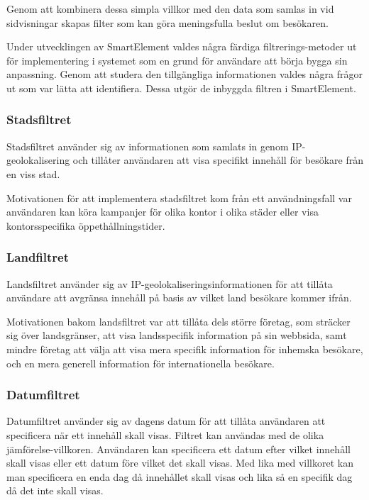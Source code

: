 Genom att kombinera dessa simpla villkor med den data som samlas in vid sidvisningar skapas filter som kan göra meningsfulla beslut om besökaren.

Under utvecklingen av SmartElement valdes några färdiga filtrerings-metoder ut för implementering i systemet som en grund för användare att börja bygga sin anpassning. Genom att studera den tillgängliga informationen valdes några frågor ut som var lätta att identifiera. Dessa utgör de inbyggda filtren i SmartElement.

\subsubsection{Stadsfiltret}

Stadsfiltret använder sig av informationen som samlats in genom IP-geolokalisering och tillåter användaren att visa specifikt innehåll för besökare från en viss stad.

Motivationen för att implementera stadsfiltret kom från ett användningsfall var användaren kan köra kampanjer för olika kontor i olika städer eller visa kontorsspecifika öppethållningstider.

\subsubsection{Landfiltret}

Landsfiltret använder sig av IP-geolokaliseringsinformationen för att tillåta användare att avgränsa innehåll på basis av vilket land besökare kommer ifrån.

Motivationen bakom landsfiltret var att tillåta dels större företag, som sträcker sig över landsgränser, att visa landsspecifik information på sin webbsida, samt mindre företag att välja att visa mera specifik information för inhemska besökare, och en mera generell information för internationella besökare.

\subsubsection{Datumfiltret}

Datumfiltret använder sig av dagens datum för att tillåta användaren att specificera när ett innehåll skall visas. Filtret kan användas med de olika jämförelse-villkoren. Användaren kan specificera ett datum efter vilket innehåll skall visas eller ett datum före vilket det skall visas. Med lika med villkoret kan man specificera en enda dag då innehållet skall visas och lika så en specifik dag då det inte skall visas.

